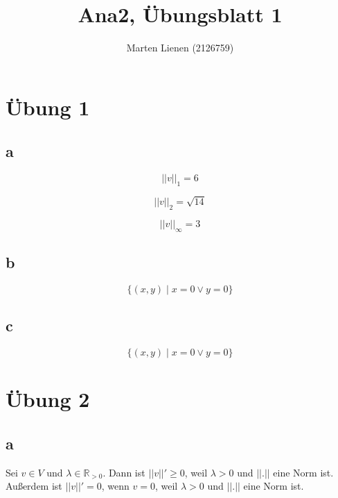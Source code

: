 \documentclass[10pt,a4paper]{article}
\title{Ana2, Übungsblatt 1}
\author{Marten Lienen (2126759)}
\begin{document}
\maketitle

\section*{Übung 1}

\subsection*{a}

\begin{equation}
||v||_{1} = 6
\end{equation}

\begin{equation}
||v||_{2} = \sqrt{14}
\end{equation}

\begin{equation}
||v||_{\infty} = 3
\end{equation}

\subsection*{b}

\begin{equation}
\{ (x,y) \mid x = 0 \lor y = 0 \}
\end{equation}

\subsection*{c}

\begin{equation}
\{ (x,y) \mid x = 0 \lor y = 0 \}
\end{equation}

\section*{Übung 2}

\subsection*{a}

Sei $v \in V$ und $\lambda \in \mathbb{R}_{> 0}$.
Dann ist $||v||' \ge 0$, weil $\lambda > 0$ und $||.||$ eine Norm ist.
Außerdem ist $||v||' = 0$, wenn $v = 0$, weil $\lambda > 0$ und $||.||$ eine Norm ist.
\end{document}
